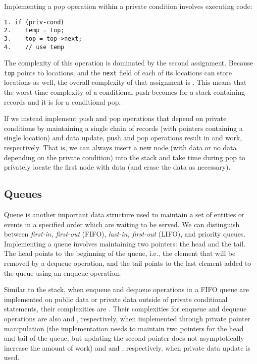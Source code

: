 \documentclass[11pt]{article}
\begin{document}
Implementing a pop operation within a private condition involves executing
code:

{\small \begin{verbatim}
1. if (priv-cond)
2.    temp = top;
3.    top = top->next;
4.    // use temp
\end{verbatim}} 
\noindent The complexity of this operation is dominated by the second
assignment. Because \texttt{top} points to  locations, and the
\texttt{next} field of each of its locations can store  locations as
well, the overall complexity of that assignment is . This means that
the worst time complexity of a conditional push becomes  for a stack
containing  records and it is  for a conditional pop.

If we instead implement push and pop operations that depend on private
conditions by maintaining a single chain of records (with pointers
containing a single location) and data update, push and pop operations
result in  and  work, respectively. That is, we can always
insert a new node (with data or no data depending on the private condition)
into the stack and take  time during pop to privately locate the first
node with data (and erase the data as necessary).

\subsection{Queues}

Queue is another important data structure used to maintain a set of entities
or events in a specified order which are waiting to be served. We can
distinguish between \textit{first-in, first-out} (FIFO), \textit{last-in,
first-out} (LIFO), and priority queues. Implementing a queue involves
maintaining two pointers: the head and the tail. The head points to the
beginning of the queue, i.e., the element that will be removed by a dequeue
operation, and the tail points to the last element added to the queue using
an enqueue operation. 

Similar to the stack, when enqueue and dequeue operations in a FIFO queue
are implemented on public data or private data outside of private
conditional statements, their complexities are . Their complexities
for enqueue and dequeue operations are also  and ,
respectively, when implemented through private pointer manipulation (the
implementation needs to maintain two pointers for the head and tail of the
queue, but updating the second pointer does not asymptotically increase the
amount of work) and  and , respectively, when private data
update is used. 
\end{document}
